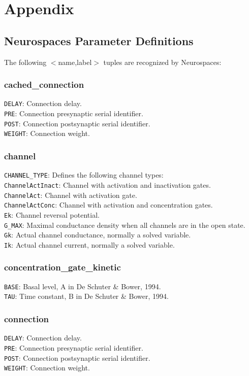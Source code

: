 \documentclass[12pt]{article}
\begin{document}
\newpage
\section{Appendix}
\subsection{Neurospaces Parameter Definitions}
The following $<$name,label$>$ tuples are recognized by Neurospaces:
\subsubsection{cached\_connection}
{\tt DELAY}: Connection delay.\\
{\tt PRE}: Connection presynaptic serial identifier.\\
{\tt POST}: Connection postsynaptic serial identifier.\\
{\tt WEIGHT}: Connection weight.
\subsubsection{channel}
{\tt CHANNEL\_TYPE}: Defines the following channel types:\\
{\tt ChannelActInact}: Channel with activation and inactivation gates.\\
{\tt ChannelAct}: Channel with activation gate.\\
{\tt ChannelActConc}: Channel with activation and concentration gates.\\
{\tt Ek}: Channel reversal potential.\\
{\tt G\_MAX}: Maximal conductance density when all channels are in the open state.\\
{\tt Gk}: Actual channel conductance, normally a solved variable.\\
{\tt Ik}: Actual channel current, normally a solved variable.
\subsubsection{concentration\_gate\_kinetic}
{\tt BASE}: Basal level, A in De Schuter \& Bower, 1994.\\
{\tt TAU}: Time constant, B in De Schuter \& Bower, 1994.
\subsubsection{connection}
{\tt DELAY}: Connection delay.\\
{\tt PRE}: Connection presynaptic serial identifier.\\
{\tt POST}: Connection postsynaptic serial identifier.\\
{\tt WEIGHT}: Connection weight.
\end{document}
